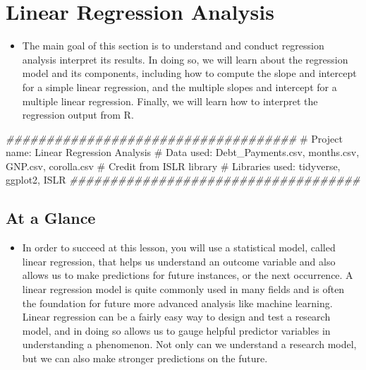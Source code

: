 \documentclass[
  letterpaper,
  DIV=11,
  numbers=noendperiod]{scrreprt}
\newenvironment{Shaded}{\begin{snugshade}}{\end{snugshade}}
\newcommand{\CommentTok}[1]{\textcolor[rgb]{0.37,0.37,0.37}{#1}}
\newcommand{\DocumentationTok}[1]{\textcolor[rgb]{0.37,0.37,0.37}{\textit{#1}}}
\providecommand{\tightlist}{%
  \setlength{\itemsep}{0pt}\setlength{\parskip}{0pt}}\usepackage{longtable,booktabs,array}
\begin{document}

\chapter{Linear Regression Analysis}\label{linear-regression-analysis}

\begin{itemize}
\tightlist
\item
  The main goal of this section is to understand and conduct regression
  analysis interpret its results. In doing so, we will learn about the
  regression model and its components, including how to compute the
  slope and intercept for a simple linear regression, and the multiple
  slopes and intercept for a multiple linear regression. Finally, we
  will learn how to interpret the regression output from R.
\end{itemize}

\begin{Shaded}
\begin{Highlighting}[]
\DocumentationTok{\#\#\#\#\#\#\#\#\#\#\#\#\#\#\#\#\#\#\#\#\#\#\#\#\#\#\#\#\#\#\#\#\#\#\#\#}
\CommentTok{\# Project name: Linear Regression Analysis}
\CommentTok{\# Data used: Debt\_Payments.csv, months.csv, GNP.csv, corolla.csv}
\CommentTok{\# Credit from ISLR library}
\CommentTok{\# Libraries used: tidyverse, ggplot2, ISLR}
\DocumentationTok{\#\#\#\#\#\#\#\#\#\#\#\#\#\#\#\#\#\#\#\#\#\#\#\#\#\#\#\#\#\#\#\#\#\#\#\#}
\end{Highlighting}
\end{Shaded}

\section{At a Glance}\label{at-a-glance-7}

\begin{itemize}
\tightlist
\item
  In order to succeed at this lesson, you will use a statistical model,
  called linear regression, that helps us understand an outcome variable
  and also allows us to make predictions for future instances, or the
  next occurrence. A linear regression model is quite commonly used in
  many fields and is often the foundation for future more advanced
  analysis like machine learning. Linear regression can be a fairly easy
  way to design and test a research model, and in doing so allows us to
  gauge helpful predictor variables in understanding a phenomenon. Not
  only can we understand a research model, but we can also make stronger
  predictions on the future.
\end{itemize}
\end{document}

